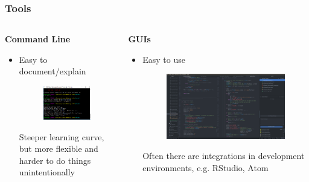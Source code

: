\documentclass{beamer}
\begin{document}
\begin{frame}
\frametitle{Tools}

\begin{columns}[t]
	\begin{column}{0.5\linewidth}
		\textbf{Command Line}
		\begin{itemize}
			\item Easy to document/explain
			
			\begin{figure}
				\includegraphics[width=\linewidth]{images/git-terminal}
			\end{figure}
			
			Steeper learning curve, but more flexible and harder to do things unintentionally
		\end{itemize}
	\end{column}

	\begin{column}{0.5\linewidth}
		\textbf{GUIs}
		\begin{itemize}
			\item Easy to use
			
			\begin{figure}
				\includegraphics[width=\linewidth]{images/atom-git}
			\end{figure}
			
			Often there are integrations in development environments, e.g. RStudio, Atom
		\end{itemize}
	\end{column}
\end{columns}



\end{frame}
\end{document}
